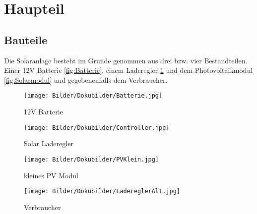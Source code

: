 \documentclass [ngerman]{mucproc}
\begin{document}
\section{Haupteil}

	\subsection{Bauteile}
		

	Die Solaranlage besteht im Grunde genommen aus drei bzw. vier Bestandteilen. Einer 12V Batterie \ref{fig:Batterie}, einem Laderegler \ref{fig:Laderegler} und dem Photovoltaikmodul \ref{fig:Solarmodul} und gegebenenfalls dem Verbraucher.

\begin{figure}
   \begin{minipage}[b]{.4\linewidth} %
      \texttt{[image: Bilder/Dokubilder/Batterie.jpg]}
      \caption{12V Batterie}
      \label{fig:Batterie}
   \end{minipage}
   \hspace{.1\linewidth}%
   \begin{minipage}[b]{.4\linewidth} %
      \texttt{[image: Bilder/Dokubilder/Controller.jpg]}
      \caption{Solar Laderegler}
		\label{fig:Laderegler}
   \end{minipage}
\end{figure}

\begin{figure}
   \begin{minipage}[b]{.4\linewidth} %
      \texttt{[image: Bilder/Dokubilder/PVKlein.jpg]}
		\caption{kleines PV Modul}
		\label{fig:Solarmodul}
   \end{minipage}
   \hspace{.1\linewidth}%
   \begin{minipage}[b]{.4\linewidth} %
      \texttt{[image: Bilder/Dokubilder/LadereglerAlt.jpg]}
			\caption{Verbraucher}
			\label{fig:Verbraucher}
   \end{minipage}
\end{figure}





%		
%		
	
\end{document}
